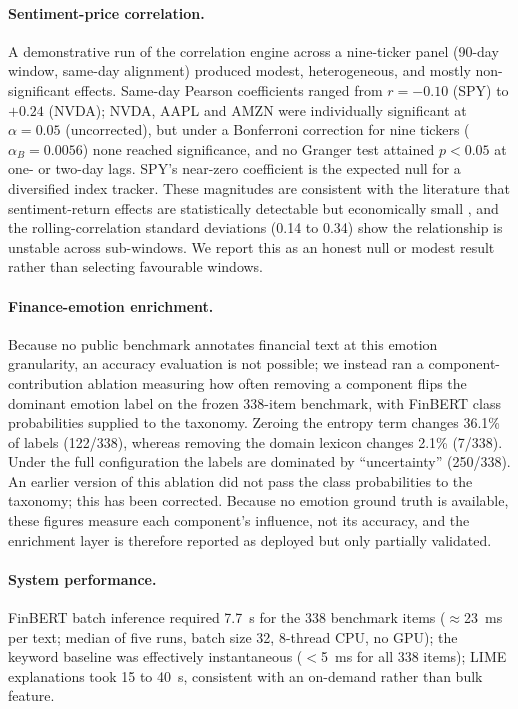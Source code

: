 \documentclass{aims}
\numberwithin{equation}{section}
\begin{document}
\paragraph{Sentiment-price correlation.}
A demonstrative run of the correlation engine across a nine-ticker panel (90-day
window, same-day alignment) produced modest, heterogeneous, and mostly
non-significant effects. Same-day Pearson coefficients ranged from $r = -0.10$ (SPY)
to $+0.24$ (NVDA); NVDA, AAPL and AMZN were individually significant at
$\alpha = 0.05$ (uncorrected), but under a Bonferroni correction for nine tickers
($\alpha_B = 0.0056$) none reached significance, and no Granger test attained
$p < 0.05$ at one- or two-day lags. SPY's near-zero coefficient is the expected null
for a diversified index tracker. These magnitudes are consistent with the literature
that sentiment-return effects are statistically detectable but economically small
\citep{tetlock2007,kraaijeveld2020}, and the rolling-correlation standard deviations
(0.14 to 0.34) show the relationship is unstable across sub-windows. We report this
as an honest null or modest result rather than selecting favourable windows.

\paragraph{Finance-emotion enrichment.}
Because no public benchmark annotates financial text at this emotion granularity, an
accuracy evaluation is not possible; we instead ran a component-contribution
ablation measuring how often removing a component flips the dominant emotion label on
the frozen 338-item benchmark, with FinBERT class probabilities supplied to the
taxonomy. Zeroing the entropy term changes 36.1\% of labels (122/338), whereas
removing the domain lexicon changes 2.1\% (7/338). Under the full configuration the
labels are dominated by ``uncertainty'' (250/338). An earlier version of this ablation
did not pass the class probabilities to the taxonomy; this has been corrected. Because no
emotion ground truth is available, these figures measure each component's influence,
not its accuracy, and the enrichment layer is therefore reported as deployed but only
partially validated.

\paragraph{System performance.}
FinBERT batch inference required 7.7~s for the 338 benchmark items ($\approx$23~ms per
text; median of five runs, batch size 32, 8-thread CPU, no GPU);
the keyword baseline was effectively instantaneous ($<$5~ms for all 338 items); LIME explanations took 15 to
40~s, consistent with an on-demand rather than bulk feature.
\end{document}

